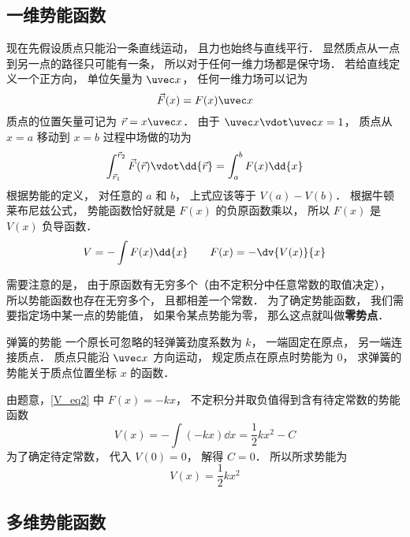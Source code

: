 \subsection{一维势能函数}

现在先假设质点只能沿一条直线运动， 且力也始终与直线平行． 显然质点从一点到另一点的路径只可能有一条， 所以对于任何一维力场都是保守场． 若给直线定义一个正方向， 单位矢量为 $\uvec x$， 任何一维力场可以记为
\begin{equation}\label{V_eq2}
\vec F(x) = F(x) \uvec x
\end{equation}
质点的位置矢量可记为 $\vec r = x \uvec x$． 由于 $\uvec x \vdot \uvec x = 1$， 质点从 $x = a$ 移动到 $x=b$ 过程中场做的功为
\begin{equation}
\int_{\vec r_1}^{\vec r_2} \vec F(\vec r) \vdot \dd{\vec r}
= \int_a^b F(x) \dd{x}
\end{equation}
根据势能的定义， 对任意的 $a$ 和 $b$， 上式应该等于 $V(a) - V(b)$． 根据牛顿莱布尼兹公式， 势能函数恰好就是 $F(x)$ 的负原函数乘以， 所以 $F(x)$ 是 $V(x)$ 负导函数．
\begin{equation}\label{V_eq8}
V = -\int F(x) \dd{x}
\qquad
F(x) = -\dv{V(x)}{x}
\end{equation}

需要注意的是， 由于原函数有无穷多个（由不定积分中任意常数的取值决定）， 所以势能函数也存在无穷多个， 且都相差一个常数． 为了确定势能函数， 我们需要指定场中某一点的势能值， 如果令某点势能为零， 那么这点就叫做\textbf{零势点}．

\begin{exam}{弹簧的势能}
一个原长可忽略的轻弹簧劲度系数为 $k$， 一端固定在原点， 另一端连接质点． 质点只能沿 $\uvec x$ 方向运动， 规定质点在原点时势能为 $0$， 求弹簧的势能关于质点位置坐标 $x$ 的函数． 

由题意，\autoref{V_eq2} 中 $F(x) = -kx$， 不定积分并取负值得到含有待定常数的势能函数
\begin{equation}
V(x) = -\int (-kx) \dd{x} = \frac 12 k x^2 - C
\end{equation}
为了确定待定常数， 代入 $V(0) = 0$， 解得 $C = 0$． 所以所求势能为
\begin{equation}
V(x) =  \frac 12 k x^2
\end{equation}
\end{exam}


\subsection{多维势能函数}

